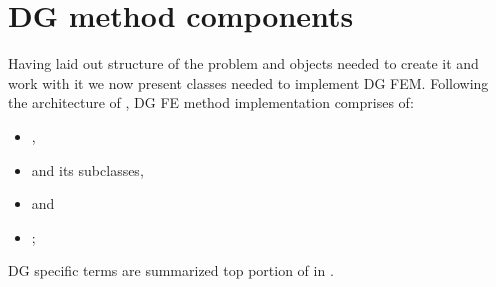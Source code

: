 \section{DG method components}
Having laid out structure of the \sfepy{} problem and objects needed to create 
it and work with it we now present classes needed to implement DG FEM. Following the 
architecture of \sfepy{}, DG FE method implementation comprises of: 
\begin{itemize}
    \item {}, 
    \item {} and its subclasses,
    \item {} and
    \item {};
\end{itemize}
DG specific terms are summarized top portion of in .
